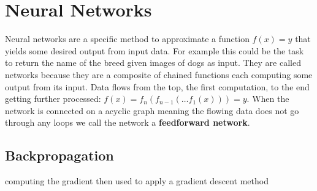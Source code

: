\section{Neural Networks}
\label{sec:concepts:nn}
Neural networks are a specific method to approximate a function $f(x) = y$ that yields some desired output from input data. For example this could be the task to return the name of the breed given images of dogs as input. They are called networks because they are a composite of chained functions each computing some output from its input. Data flows from the top, the first computation, to the end getting further processed: $f(x) = f_n(f_{n-1}(\dots f_1(x))) = y$. When the network is connected on a acyclic graph meaning the flowing data does not go through any loops we call the network a \textbf{feedforward network}.


\subsection{Backpropagation}
\label{sub:concepts:nn:backprob}
\citet{rumelhart_learning_1988}
computing the gradient then used to apply a gradient descent method



